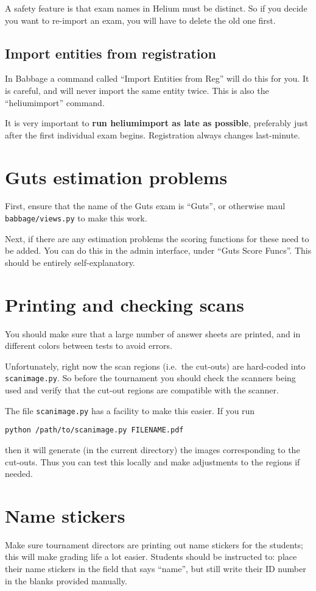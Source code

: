 A safety feature is that exam names in Helium must be distinct.
So if you decide you want to re-import an exam,
you will have to delete the old one first.

\subsection{Import entities from registration}
In Babbage a command called ``Import Entities from Reg'' will do this for you.
It is careful, and will never import the same entity twice.
This is also the ``heliumimport'' command.

It is very important to \textbf{run heliumimport as late as possible},
preferably just after the first individual exam begins.
Registration always changes last-minute.

\section{Guts estimation problems}
First, ensure that the name of the Guts exam is ``Guts'',
or otherwise maul \texttt{babbage/views.py} to make this work.

Next, if there are any estimation problems the scoring functions
for these need to be added.
You can do this in the admin interface, under ``Guts Score Funcs''.
This should be entirely self-explanatory.

\section{Printing and checking scans}
You should make sure that a large number of answer sheets are printed,
and in different colors between tests to avoid errors.

Unfortunately, right now the scan regions (i.e.\ the cut-outs)
are hard-coded into \verb+scanimage.py+.
So before the tournament you should check the scanners being used
and verify that the cut-out regions are compatible with the scanner.

The file \verb+scanimage.py+ has a facility to make this easier.
If you run
\begin{center}
\verb+python /path/to/scanimage.py FILENAME.pdf+
\end{center}
then it will generate (in the current directory)
the images corresponding to the cut-outs.
Thus you can test this locally and make adjustments to the regions if needed.
\section{Name stickers}
Make sure tournament directors are printing out name stickers for the students;
this will make grading life a lot easier.
Students should be instructed to:
place their name stickers in the field that says ``name'',
but still write their ID number in the blanks provided manually.

